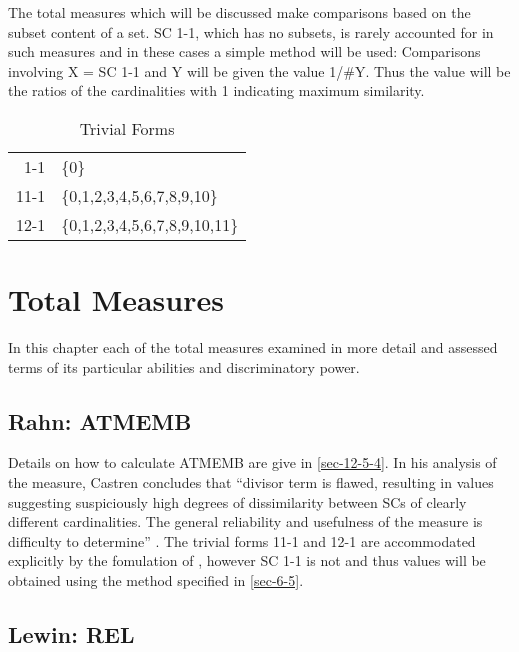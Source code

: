 \documentclass{article}
\begin{document}
The total measures which will be discussed make comparisons based on
the subset content of a set. SC 1-1, which has no subsets, is rarely
accounted for in such measures and in these cases a simple method will
be used: Comparisons involving X = SC 1-1 and Y will be given the
value 1/\#Y. Thus the value will be the ratios of the cardinalities
with 1 indicating maximum similarity.
\begin{table}[htb]
\caption{Trivial Forms} 
\begin{center}
\begin{tabular}{rl}
  1-1  &  \{0\}                          \\
 11-1  &  \{0,1,2,3,4,5,6,7,8,9,10\}     \\
 12-1  &  \{0,1,2,3,4,5,6,7,8,9,10,11\}  \\
\end{tabular}
\end{center}
\end{table}
\section{Total Measures}
\label{sec-7}

In this chapter each of the total measures examined in more detail and
assessed terms of its particular abilities and discriminatory power.
\subsection{Rahn: ATMEMB}
\label{sec-7-1}

Details on how to calculate ATMEMB are give in \ref{sec-12-5-4}. In his analysis
of the measure, Castren concludes that ``divisor term is flawed,
resulting in values suggesting suspiciously high degrees of
dissimilarity between SCs of clearly different cardinalities. The
general reliability and usefulness of the measure is difficulty to
determine'' \citep[pp. 89]{Castren1994}. The trivial forms 11-1 and
12-1 are accommodated explicitly by the fomulation of
\citet{Rahn1979}, however SC 1-1 is not and thus values will be
obtained using the method specified in \ref{sec-6-5}.
\subsection{Lewin: REL}
\label{sec-7-2}
\end{document}
